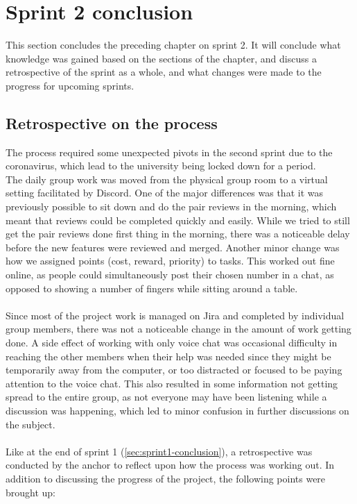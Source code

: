 \section{Sprint 2 conclusion}\label{sec:sprint2-conclusion}
This section concludes the preceding chapter on sprint 2.
It will conclude what knowledge was gained based on the sections of the chapter, and discuss a retrospective of the sprint as a whole, and what changes were made to the progress for upcoming sprints.



\subsection{Retrospective on the process}
The process required some unexpected pivots in the second sprint due to the coronavirus, which lead to the university being locked down for a period.
\\
The daily group work was moved from the physical group room to a virtual setting facilitated by Discord.
One of the major differences was that it was previously possible to sit down and do the pair reviews in the morning, which meant that reviews could be completed quickly and easily.
While we tried to still get the pair reviews done first thing in the morning, there was a noticeable delay before the new features were reviewed and merged.
Another minor change was how we assigned points (cost, reward, priority) to tasks. This worked out fine online, as people could simultaneously post their chosen number in a chat, as opposed to showing a number of fingers while sitting around a table.
\\\\
Since most of the project work is managed on Jira and completed by individual group members, there was not a noticeable change in the amount of work getting done.
A side effect of working with only voice chat was occasional difficulty in reaching the other members when their help was needed since they might be temporarily away from the computer, or too distracted or focused to be paying attention to the voice chat.
This also resulted in some information not getting spread to the entire group, as not everyone may have been listening while a discussion was happening, which led to minor confusion in further discussions on the subject.\\\\
Like at the end of sprint 1 (\autoref{sec:sprint1-conclusion}), a retrospective was conducted by the anchor to reflect upon how the process was working out.
In addition to discussing the progress of the project, the following points were brought up:

